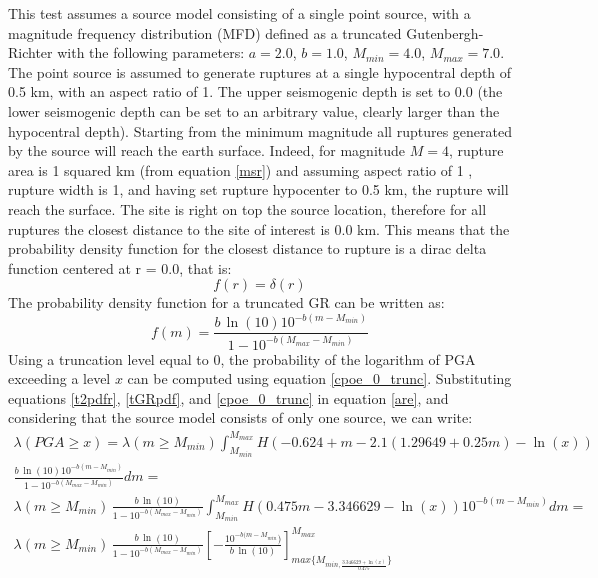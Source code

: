 This test assumes a source model consisting of a single point source, 
with a magnitude frequency distribution (MFD)
defined as a truncated Gutenbergh-Richter with the following parameters:
$a=2.0$, $b=1.0$, $M_{min}=4.0$, $M_{max}=7.0$.
The point source is assumed to generate ruptures at a single hypocentral depth
of 0.5 km, with an aspect ratio of 1.  The upper seismogenic depth is set to 0.0
(the lower seismogenic depth can be set to an arbitrary value, clearly larger
than the hypocentral depth).
%
Starting from the minimum magnitude all ruptures generated by the source will
reach the earth surface.  Indeed, for magnitude $M=4$, rupture area is 1 squared
km (from equation \ref{msr}) and assuming aspect ratio of 1 , rupture width is
1, and having set rupture hypocenter to 0.5 km, the rupture will reach the
surface. The site is right on top the source location, therefore for
all ruptures the closest distance to the site of interest is 0.0 km. 
%
This means that the probability density function for the closest distance to
rupture is a dirac delta function centered at r = 0.0, that is:
\begin{equation}
\label{t2pdfr}
f(r) = \delta(r)
\end{equation}
The probability density function for a truncated GR can be written as:
\begin{equation}
\label{tGRpdf}
f(m) = \frac{b \,\ln(10) 10^{-b(m-M_{min})}}{1 - 10^{-b(M_{max} - M_{min})}}
\end{equation}
Using a truncation level equal to 0, the probability of the logarithm of PGA
exceeding a level $x$ can be computed using equation \ref{cpoe_0_trunc}.
Substituting equations \ref{t2pdfr}, \ref{tGRpdf}, and \ref{cpoe_0_trunc} in
equation \ref{are}, and considering that the source model consists of only one
source, we can write:
\begin{eqnarray}
    \label{aret2}
    \lambda(PGA \geq x) =  \lambda(m\geq M_{min}) \int_{M_{min}}^{M_{max}}
    H(-0.624 + m - 2.1 (1.29649 + 0.25 m) - \ln(x)) \nonumber \\
    \frac{b \,\ln(10) 10^{-b(m-M_{min})}}{1 - 10^{-b(M_{max} - M_{min})}} dm =\nonumber \\
     \lambda(m\geq M_{min})\, \frac{b \,\ln(10)}{1 - 10^{-b(M_{max} - M_{min})}}
     \int_{M_{min}}^{M_{max}} H(0.475m - 3.346629 - \ln(x)) 10^{-b(m-M_{min})} dm =\nonumber \\
      \lambda(m\geq M_{min})\, \frac{b \,\ln(10)}{1 - 10^{-b(M_{max} -
      M_{min})}} \left[ -\frac{10^{-b(m - M_{min}})}{b\,\ln(10)} \right]_{max\{
      M_{min, \frac{3.346629 + \ln(x)}{0.475}} \}}^{M_{max}}
\end{eqnarray}
